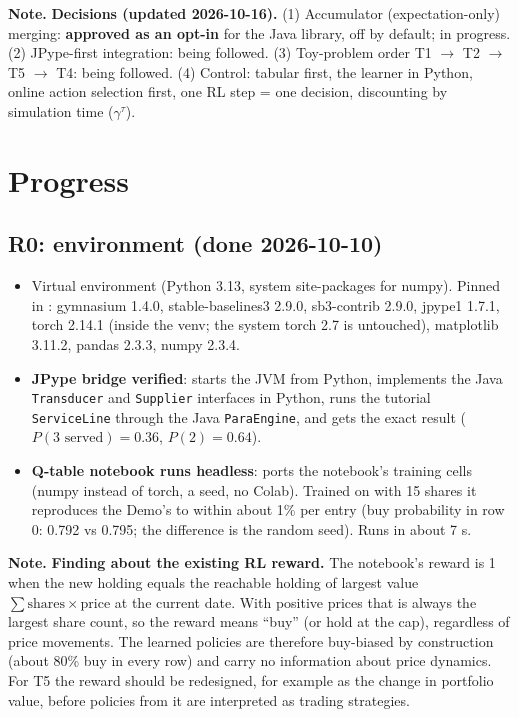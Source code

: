 \documentclass[11pt]{article}
\newcommand{\code}[1]{\texttt{#1}}
\newcommand{\note}[1]{\par\noindent\colorbox{notebg}{\parbox{\dimexpr\linewidth-2\fboxsep}{\small\textbf{Note.} #1}}\par}
\begin{document}
\note{\textbf{Decisions (updated 2026-10-16).} (1) Accumulator (expectation-only) merging: \textbf{approved as an
opt-in} for the Java library, off by default; in progress. (2) JPype-first integration: being followed. (3) Toy-problem
order T1 $\to$ T2 $\to$ T5 $\to$ T4: being followed. (4) Control: tabular first, the learner in Python, online action
selection first, one RL step = one decision, discounting by simulation time ($\gamma^\tau$).}

\section{Progress}
\label{sec:progress}

\subsection{R0: environment (done 2026-10-10)}
\begin{itemize}
\item Virtual environment  (Python 3.13, system site-packages for numpy). Pinned in
  : gymnasium 1.4.0, stable-baselines3 2.9.0, sb3-contrib 2.9.0, jpype1 1.7.1, torch 2.14.1
  (inside the venv; the system torch 2.7 is untouched), matplotlib 3.11.2, pandas 2.3.3, numpy 2.3.4.
\item \textbf{JPype bridge verified}:  starts the JVM from Python, implements the Java
  \code{Transducer} and \code{Supplier} interfaces in Python, runs the tutorial \code{ServiceLine} through the Java
  \code{ParaEngine}, and gets the exact result ($P(3\text{ served})=0.36$, $P(2)=0.64$).
\item \textbf{Q-table notebook runs headless}:  ports the notebook's
  training cells (numpy instead of torch, a seed, no Colab). Trained on  with 15 shares it reproduces
  the Demo's  to within about 1\% per entry (buy probability in row 0: 0.792 vs 0.795;
  the difference is the random seed). Runs in about 7 s.
\end{itemize}

\note{\textbf{Finding about the existing RL reward.} The notebook's reward is 1 when the new holding equals the
reachable holding of largest value $\sum \text{shares}\times\text{price}$ at the current date. With positive prices that
is always the largest share count, so the reward means ``buy'' (or hold at the cap), regardless of price movements. The
learned policies are therefore buy-biased by construction (about 80\% buy in every row) and carry no information about
price dynamics. For T5 the reward should be redesigned, for example as the change in portfolio value, before policies
from it are interpreted as trading strategies.}
\end{document}
